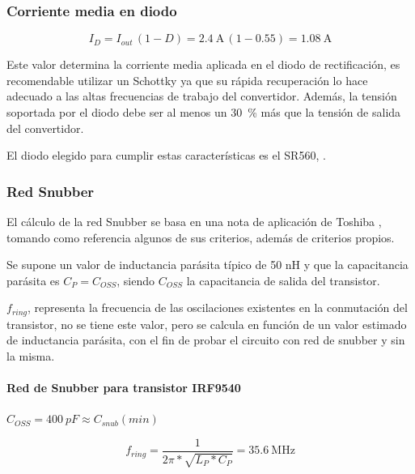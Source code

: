 \subsubsection{Corriente media en diodo}
\vspace{-0.25cm}
\begin{equation} \label{eq:buck:corriente_diodo_rectificacion}
    I_D = I_{out} \, (1-D) = \SI{2.4}{\ampere} \, (1-0.55) = \SI{1.08}{\ampere}
\end{equation}

Este valor determina la corriente media aplicada en el diodo de rectificación, es recomendable utilizar un Schottky ya que su rápida recuperación lo hace adecuado a las altas frecuencias de trabajo del convertidor. Además, la tensión soportada por el diodo debe ser al menos un \SI{30}{\percent} más que la tensión de salida del convertidor.

El diodo elegido para cumplir estas características es el SR560, \parencite{SR560}.

\subsubsection{Red Snubber}

El cálculo de la red Snubber se basa en una nota de aplicación de Toshiba \parencite{toshiba_2018_power}, tomando como referencia algunos de sus criterios, además de criterios propios.

Se supone un valor de inductancia parásita típico de 50 nH y que la capacitancia parásita es $C_P = C_{OSS}$, siendo $C_{OSS}$ la capacitancia de salida del transistor.

$f_{ring}$, representa la frecuencia de las oscilaciones existentes en la conmutación del transistor, no se tiene este valor, pero se calcula en función de un valor estimado de inductancia parásita, con el fin de probar el circuito con red de snubber y sin la misma.

\paragraph{Red de Snubber para transistor IRF9540}

$C_{OSS} = 400 \ pF \approx C_{snub}(min)$

\begin{equation} \label{eq:buck:frecuencia-oscilacion-mos-snubber}
    f_{ring} = \frac{1}{2 \pi * \sqrt{L_P * C_P}} = \SI{35.6}{\mega\hertz}
\end{equation}

